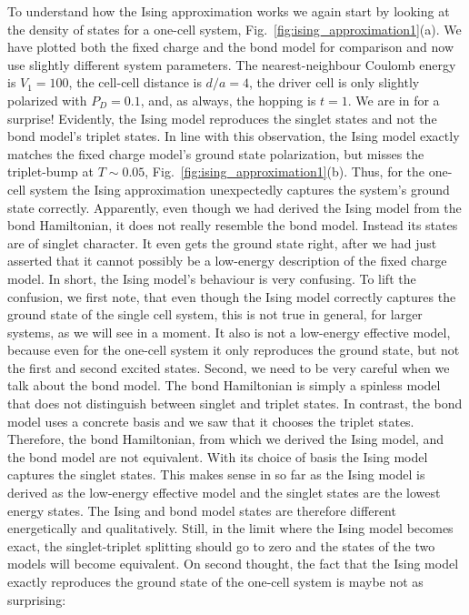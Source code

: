 To understand how the Ising approximation works we again start by looking at the
density of states for a one-cell system, Fig.~\ref{fig:ising_approximation1}(a).
We have plotted both the fixed charge and the bond model for comparison and now
use slightly different system parameters. The nearest-neighbour Coulomb energy
is $V_1 = 100$, the cell-cell distance is $d/a = 4$, the driver cell is only
slightly polarized with $P_D = 0.1$, and, as always, the hopping is $t=1$. We are in for a surprise! Evidently, the
Ising model reproduces the singlet states and not the bond model's triplet
states. In line with this observation, the Ising model exactly matches the fixed
charge model's ground state polarization, but misses the triplet-bump at $T \sim
0.05$, Fig.~\ref{fig:ising_approximation1}(b). Thus, for the one-cell system the
Ising approximation unexpectedly captures the system's ground state correctly.
Apparently, even though we had derived the Ising model from the bond
Hamiltonian, it does not really resemble the bond model. Instead its states are
of singlet character. It even gets the ground state right, after we had just
asserted that it cannot possibly be a low-energy description of the fixed charge model.
In short, the Ising model's behaviour is very confusing. To lift the confusion,
we first note, that even though the Ising model correctly captures the ground
state of the single cell system, this is not true in general, for larger
systems, as we will see in a moment. It also is not a low-energy effective model, because
even for the one-cell system it only reproduces the ground state, but not the
first and second excited states. Second, we need to be very careful when we talk
about the bond model. The bond Hamiltonian is simply a spinless model that does
not distinguish between singlet and triplet states. In contrast, the bond model
uses a concrete basis and we saw that it chooses the triplet states. Therefore,
the bond Hamiltonian, from which we derived the Ising model, and the bond model
are not equivalent. With its choice of basis the Ising model captures the
singlet states. This makes sense in so far as the Ising model is derived as the
low-energy effective model and the singlet states are the lowest energy states.
The Ising and bond model states are therefore different energetically and
qualitatively. Still, in the limit where the Ising model becomes exact, the
singlet-triplet splitting should go to zero and the states of the two models
will become equivalent. On second thought, the fact that the Ising model exactly
reproduces the ground state of the one-cell system is maybe not as surprising:
